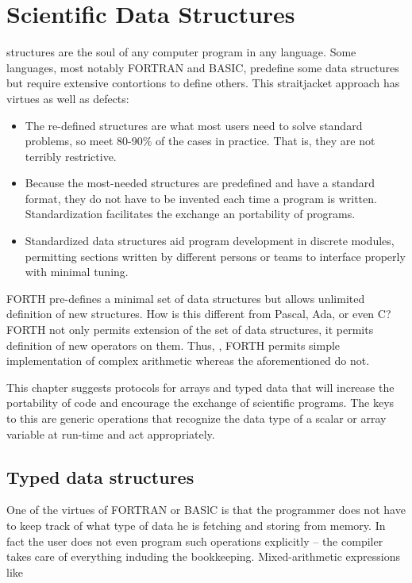 
\chapter{Scientific Data Structures}\label{chap:05}

 structures are the soul of any computer program in any language. Some languages, most notably FORTRAN and BASIC, predefine some data structures but require extensive contortions to define others. This straitjacket approach has virtues as well as defects:

\begin{itemize}
    \item The re-defined structures are what most users need to solve standard problems, so meet 80-90\% of the cases in practice. That is, they are not terribly restrictive.
    \item Because the most-needed structures are predefined and have a standard format, they do not have to be invented each time a program is written. Standardization facilitates the exchange an portability of programs.
    \item Standardized data structures aid program development in discrete modules, permitting sections written by different persons or teams to interface properly with minimal tuning.
\end{itemize}

FORTH pre-defines a minimal set of data structures but allows unlimited definition of new structures. How is this different from Pascal, Ada, or even C? FORTH not only permits extension of the set of data structures, it permits definition of new operators on them. Thus, \eg, FORTH permits simple implementation of complex arithmetic whereas the aforementioned do not.

This chapter suggests protocols for arrays and typed data that will increase the portability of code and encourage the exchange of scientific programs. The keys to this are generic operations that recognize the data type of a scalar or array variable at run-time and act appropriately.

\section{Typed data structures}\label{chap:05_01}
One of the virtues of FORTRAN or BASlC is that the programmer does not have to keep track of what type of data he is fetching and storing from memory. In fact the user does not even program such operations explicitly -- the compiler takes care of everything induding the bookkeeping. Mixed-arithmetic expressions like

